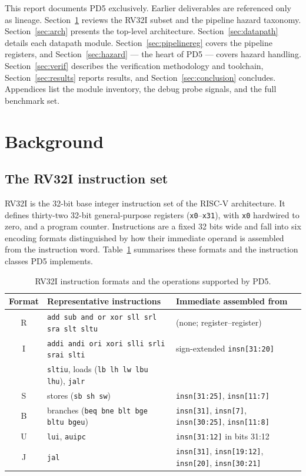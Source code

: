 \documentclass[11pt,a4paper]{article}
\newcommand{\sig}[1]{\texttt{#1}}
\begin{document}
This report documents PD5 exclusively. Earlier deliverables are referenced only as
lineage. Section~\ref{sec:background} reviews the RV32I subset and the pipeline hazard
taxonomy. Section~\ref{sec:arch} presents the top-level architecture.
Section~\ref{sec:datapath} details each datapath module. Section~\ref{sec:pipelinereg}
covers the pipeline registers, and Section~\ref{sec:hazard} --- the heart of PD5 ---
covers hazard handling. Section~\ref{sec:verif} describes the verification methodology and
toolchain, Section~\ref{sec:results} reports results, and Section~\ref{sec:conclusion}
concludes. Appendices list the module inventory, the debug probe signals, and the full
benchmark set.

\section{Background}
\label{sec:background}
\subsection{The RV32I instruction set}
RV32I is the 32-bit base integer instruction set of the RISC-V architecture. It defines
thirty-two 32-bit general-purpose registers (\sig{x0}--\sig{x31}), with \sig{x0} hardwired
to zero, and a program counter. Instructions are a fixed 32 bits wide and fall into six
encoding formats distinguished by how their immediate operand is assembled from the
instruction word. Table~\ref{tab:formats} summarises these formats and the instruction
classes PD5 implements.

\begin{table}[h]
\centering
\caption{RV32I instruction formats and the operations supported by PD5.}
\label{tab:formats}
\small
\begin{tabular}{@{}c l l@{}}
\toprule
\textbf{Format} & \textbf{Representative instructions} & \textbf{Immediate assembled from} \\
\midrule
R & \sig{add sub and or xor sll srl sra slt sltu} & (none; register--register) \\
I & \sig{addi andi ori xori slli srli srai slti}   & sign-extended \sig{insn[31:20]} \\
  & \sig{sltiu}, loads (\sig{lb lh lw lbu lhu}), \sig{jalr} & \\
S & stores (\sig{sb sh sw})                          & \sig{insn[31:25]}, \sig{insn[11:7]} \\
B & branches (\sig{beq bne blt bge bltu bgeu})       & \sig{insn[31]}, \sig{insn[7]}, \sig{insn[30:25]}, \sig{insn[11:8]} \\
U & \sig{lui}, \sig{auipc}                            & \sig{insn[31:12]} in bits 31:12 \\
J & \sig{jal}                                         & \sig{insn[31]}, \sig{insn[19:12]}, \sig{insn[20]}, \sig{insn[30:21]} \\
\bottomrule
\end{tabular}
\end{table}
\end{document}

